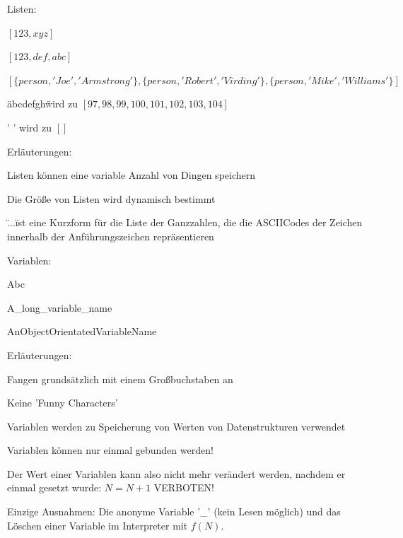 \documentclass[10pt]{article}
\begin{document}
Listen:
\begin{itemize*}
  \item $[123, xyz]$
  \item $[123, def, abc]$
  \item $[\{person, 'Joe', 'Armstrong'\}, \{person, 'Robert', 'Virding'\}, \{person, 'Mike', 'Williams'\}]$
  \item \"abcdefgh\" wird zu $[97,98,99,100,101,102,103,104]$
  \item ' ' wird zu $[ ]$
  \item Erläuterungen:
  \begin{itemize*}
    \item Listen können eine variable Anzahl von Dingen speichern
    \item Die Größe von Listen wird dynamisch bestimmt
    \item \"...\" ist eine Kurzform für die Liste der Ganzzahlen, die die ASCIICodes der Zeichen innerhalb der Anführungszeichen repräsentieren
  \end{itemize*}
\end{itemize*}

Variablen:
\begin{itemize*}
  \item Abc
  \item A\_long\_variable\_name
  \item AnObjectOrientatedVariableName
  \item Erläuterungen:
  \begin{itemize*}
    \item Fangen grundsätzlich mit einem Großbuchstaben an
    \item Keine 'Funny Characters'
    \item Variablen werden zu Speicherung von Werten von Datenstrukturen verwendet
    \item Variablen können nur einmal gebunden werden!
    \item Der Wert einer Variablen kann also nicht mehr verändert werden, nachdem er einmal gesetzt wurde: $N = N + 1$ VERBOTEN!
    \item Einzige Ausnahmen: Die anonyme Variable '\_' (kein Lesen möglich) und das Löschen einer Variable im Interpreter mit $f(N)$.
  \end{itemize*}
\end{itemize*}
\end{document}
